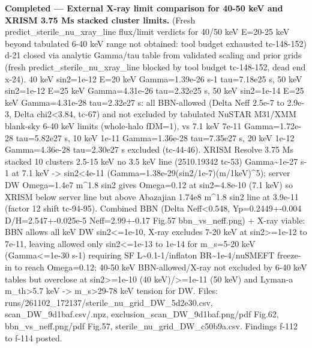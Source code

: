 \documentclass[11pt,a4paper]{article}
\begin{document}
\textbf{Completed --- External X-ray limit comparison for 40-50 keV and XRISM 3.75 Ms stacked cluster limits.} (Fresh predict\_sterile\_nu\_xray\_line flux/limit verdicts for 40/50 keV E=20-25 keV beyond tabulated 6-40 keV range not obtained: tool budget exhausted tc-148-152) d-21 closed via analytic Gamma/tau table from validated scaling and prior grids (fresh predict\_sterile\_nu\_xray\_line blocked by tool budget tc-148-152, dead end x-24). 40 keV sin2=1e-12 E=20 keV Gamma=1.39e-26 s-1 tau=7.18e25 s, 50 keV sin2=1e-12 E=25 keV Gamma=4.31e-26 tau=2.32e25 s, 50 keV sin2=1e-14 E=25 keV Gamma=4.31e-28 tau=2.32e27 s: all BBN-allowed (Delta Neff 2.5e-7 to 2.9e-3, Delta chi2\textless{}3.84, tc-67) and not excluded by tabulated NuSTAR M31/XMM blank-sky 6-40 keV limits (whole-halo fDM=1), vs 7.1 keV 7e-11 Gamma=1.72e-28 tau=5.82e27 s, 10 keV 1e-11 Gamma=1.36e-28 tau=7.35e27 s, 20 keV 1e-12 Gamma=4.36e-28 tau=2.30e27 s excluded (tc-44-46). XRISM Resolve 3.75 Ms stacked 10 clusters 2.5-15 keV no 3.5 keV line (2510.19342 tc-53) Gamma\textasciitilde{}1e-27 s-1 at 7.1 keV -\textgreater{} sin2\textless{}4e-11 (Gamma=1.38e-29(sin2/1e-7)(m/1keV)\textasciicircum{}5); server DW Omega=1.4e7 m\textasciicircum{}1.8 sin2 gives Omega=0.12 at sin2=4.8e-10 (7.1 keV) so XRISM below server line but above Abazajian 1.74e8 m\textasciicircum{}1.8 sin2 line at 3.9e-11 (factor 12 shift tc-94-95). Combined BBN (Delta Neff\textless{}0.548, Yp=0.2449+-0.004 D/H=2.547+-0.025e-5 Neff=2.99+-0.17 Fig.57 bbn\_vs\_neff.png) + X-ray viable: BBN allows all keV DW sin2\textless{}=1e-10, X-ray excludes 7-20 keV at sin2\textgreater{}=1e-12 to 7e-11, leaving allowed only sin2\textless{}=1e-13 to 1e-14 for m\_s=5-20 keV (Gamma\textless{}=1e-30 s-1) requiring SF L\textasciitilde{}0.1-1/inflaton BR\textasciitilde{}1e-4/nuSMEFT freeze-in to reach Omega=0.12; 40-50 keV BBN-allowed/X-ray not excluded by 6-40 keV tables but overclose at sin2\textgreater{}=1e-10 (40 keV)/\textgreater{}=1e-11 (50 keV) and Lyman-a m\_th\textgreater{}5.7 keV -\textgreater{} m\_s\textgreater{}29-78 keV tension for DW. Files: runs/261102\_172137/sterile\_nu\_grid\_DW\_5d2e30.csv, scan\_DW\_9d1baf.csv/.npz, exclusion\_scan\_DW\_9d1baf.png/pdf Fig.62, bbn\_vs\_neff.png/pdf Fig.57, sterile\_nu\_grid\_DW\_c50b9a.csv. Findings f-112 to f-114 posted.
\end{document}
